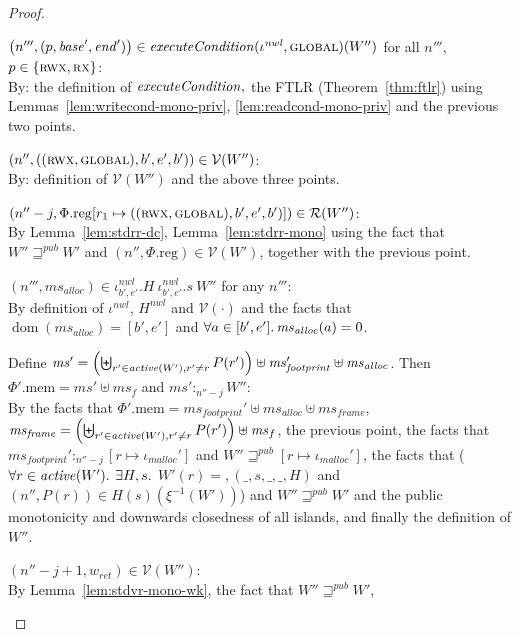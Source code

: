 \documentclass[a4paper]{article}
\newcommand{\update}[2]{[#1 \mapsto #2]}
\DeclareMathOperator{\dom}{dom}
\newcommand{\var}[1]{\mathit{#1}}
\newcommand{\hs}{\var{ms}}
\newcommand{\ms}{\hs}
\newcommand{\start}{\var{base}}
\newcommand{\addrend}{\var{end}}
\newcommand{\heap}{\var{mem}}
\newcommand{\nwl}{\var{nwl}}
\newcommand{\plainproj}[1]{\mathrm{#1}}
\newcommand{\memheap}[1][\Phi]{#1.\plainproj{mem}}
\newcommand{\memreg}[1][\Phi]{#1.\plainproj{reg}}
\newcommand{\plainfun}[2]{
  \ifthenelse{\equal{#2}{}}
  {\mathit{#1}}
  {\mathit{#1}(#2)}
}
\newcommand{\execCond}[1]{\plainfun{executeCondition}{#1}}
\newcommand{\activeReg}[1]{\plainfun{active}{#1}}
\newcommand{\futurewk}{\mathbin{\sqsupseteq}^{\var{pub}}}
\newcommand{\heapSat}[3][\heap]{#1 :_{#2} #3}
\newcommand{\codelabel}[1]{\mathit{#1}}
\newcommand{\malloc}{\codelabel{malloc}}
\newcommand{\asmType}{\plaindom{AsmType}}
\newcommand{\plaindom}[1]{\mathrm{#1}}
\newcommand{\intr}[2]{\mathcal{#1}}
\newcommand{\valueintr}[1]{\intr{V}{#1}}
\newcommand{\regintr}[1]{\intr{R}{#1}}
\newcommand{\stdvr}{\valueintr{\asmType}}
\newcommand{\stdrr}{\regintr{\asmType}}
\newcommand{\npair}[2][n]{\left(#1,#2 \right)}
\newcommand{\plainperm}[1]{\textsc{#1}}
\newcommand{\exec}{\plainperm{rx}}
\newcommand{\rwx}{\plainperm{rwx}}
\newcommand{\glob}{\plainperm{global}}
\begin{document}
\begin{proof}
\begin{enumproof}
\begin{enumproof}
    \item
      $\npair[n''']{(p,\start',\addrend')}\in\execCond{\iota^\nwl,\glob}(W'')$
      for all $n'''$, $p \in \{\rwx,\exec\}$:\\
      By: the definition of $\execCond{}, $ the FTLR (Theorem~\ref{thm:ftlr})
      using Lemmas~\ref{lem:writecond-mono-priv}, \ref{lem:readcond-mono-priv}
      and the previous two points.
    \item $\npair[n'']{((\rwx,\glob),b',e',b')}\in\stdvr(W'')$:\\
      By: definition of $\stdvr(W'')$ and the above three points.
    \item
      $\npair[n''-j]{\memreg[\Phi]\update{r_1}{((\rwx,\glob),b',e',b')}}\in\stdrr(W'')$:\\
      By Lemma~\ref{lem:stdrr-dc}, Lemma~\ref{lem:stdrr-mono} using the fact
      that $W''\futurewk W'$ and $\npair[n'']{\memreg}\in\stdvr(W')$, together
      with the previous point.
    \item $\npair[n''']{\ms_{\var{alloc}}} \in \iota^\nwl_{b',e'}.H~
      \iota^\nwl_{b',e'}.s~ W''$ for any $n'''$:\\
      By definition of $\iota^\nwl$, $H^\nwl$ and $\stdvr(\cdot)$ and the facts
      that $\dom(\hs_{\var{alloc}}) = [b',e']$ and $\forall a
      \in [b',e']\ldotp \hs_{\var{alloc}}(a) = 0$.
    \item Define $\ms' = \left(\biguplus_{r'\in\activeReg{W'},r'\neq
          r}P(r')\right)\uplus \ms_{\var{footprint}}'\uplus\ms_{\var{alloc}}$.
      Then
      $\memheap[\Phi'] = \ms' \uplus \ms_f$ and $\heapSat[\ms']{n''-j}{W''}$:\\
      By the facts that $\memheap[\Phi']=\ms_{\var{footprint}}' \uplus
      \hs_{\var{alloc}} \uplus \ms_{\var{frame}}$, $\ms_{\var{frame}} =
      \left(\biguplus_{r'\in\activeReg{W'},r'\neq r}P(r')\right)\uplus\ms_f$,
      the previous point, the facts that
      $\heapSat[\ms_{\var{footprint}}']{n''-j}{[r \mapsto \iota_\malloc']}$ and
      $W''\futurewk [r\mapsto\iota_\malloc']$, the facts that ($\forall r \in
      \activeReg{W'} \ldotp$ $\exists H,s \ldotp$ $W'(r) =, (\_,s,\_,\_,H)$ and
      $\npair[n'']{P(r)} \in H(s)(\xi^{-1}(W'))$) and $W'' \futurewk W'$ and the
      public monotonicity and downwards closedness of all islands, and finally
      the definition of $W''$.
    \item $\npair[n''-j+1]{w_{\var{ret}}} \in \stdvr(W'')$:\\
      By Lemma~\ref{lem:stdvr-mono-wk}, the fact that $W''\futurewk W'$,

\end{enumproof}
\end{enumproof}
\end{proof}
\end{document}
